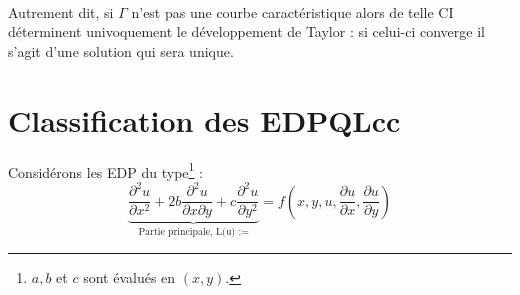 \documentclass[11pt, a4paper, openany]{book}
\begin{document}
			 \ \\
			Autrement dit, si $\Gamma$ n'est pas une courbe caractéristique alors de telle CI déterminent univoquement le développement de Taylor : si celui-ci converge il s'agit d'une solution qui sera unique.
																
			\newpage
			\section{Classification des EDPQLcc}
			Considérons les EDP du type\footnote{$a,b$ et $c$ sont évalués en $(x,y)$.} :
			\begin{equation}
				\underbrace{\frac{\partial^2u}{\partial x^2} + 2b\frac{\partial^2u}{\partial x\partial y} + c\frac{\partial^2u}{\partial y^2}}_{\text{Partie principale, L(u) :=}} = f\left(x,y,u,\frac{\partial u}{\partial x}, \frac{\partial u}{\partial y}\right)
			\end{equation}
																
\end{document}

